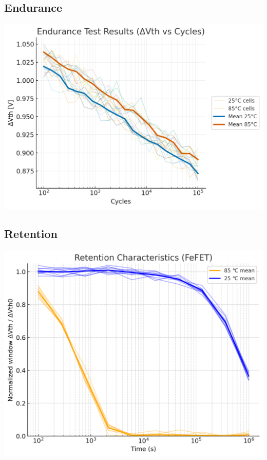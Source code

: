 \documentclass[conference]{IEEEtran}
\begin{document}
\subsection{Endurance}
\includegraphics[width=\linewidth]{figures/fig5_endurance.png}

\subsection{Retention}
\includegraphics[width=\linewidth]{figures/fig6_retention.png}
\end{document}

